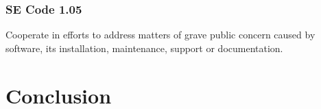 \documentclass[11pt]{article}
\begin{document}
\begin{multicols}{2}
\subsubsection*{SE Code 1.05}
Cooperate in efforts to address matters of grave public concern caused by software, its installation, maintenance, support or documentation.

\section{Conclusion}








\end{multicols}
\end{document}
